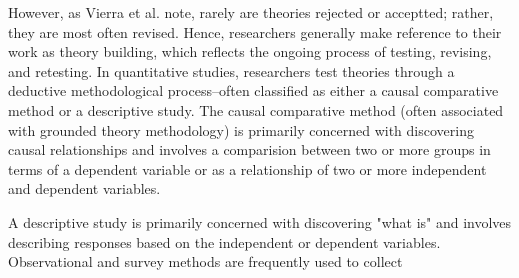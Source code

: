 \documentclass[12pt]{beamer}
\begin{document}
\begin{frame}
However, as Vierra et al. note, rarely are theories rejected or acceptted; rather, they are most often revised. Hence, researchers generally make reference to their work as theory building, which reflects the ongoing process of testing, revising, and retesting. In quantitative studies, researchers test theories through a deductive methodological process--often classified as either a causal comparative method or a descriptive study. The causal comparative method (often associated with grounded theory methodology) is primarily concerned with discovering causal relationships and involves a comparision between two or more groups in terms of a dependent variable or as a relationship of two or more independent and dependent variables.
\end{frame}
\begin{frame}
A descriptive study is primarily concerned with discovering "what is" and involves describing responses based on the independent or dependent variables. Observational and survey methods are frequently used to collect
 \end{frame}
 
\end{document}
